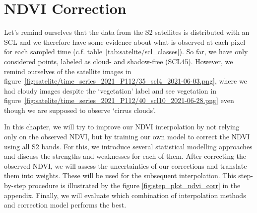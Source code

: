 \chapter{NDVI Correction} \label{sec:corr}

{
    Let's remind ourselves that the data from the S2 satellites is distributed  with an SCL and we therefore have some evidence about what is observed at each pixel for each sampled time (c.f. table~\ref{tab:satelite/scl_classes}). So far, we have only considered points, labeled as cloud- and shadow-free (SCL45). However, we remind ourselves of the satellite images in figure~\ref{fig:satelite/time_series_2021_P112/35_scl4_2021-06-03.png}, where we had cloudy images despite the `vegetation' label and see vegetation in figure~\ref{fig:satelite/time_series_2021_P112/40_scl10_2021-06-28.png} even though we are supposed to observe `cirrus clouds'.
    


    
    In this chapter, we will try to improve our NDVI interpolation by not relying only on the observed NDVI, but by training our own model to correct the NDVI using all S2 bands. For this, we introduce several statistical modelling approaches and discuss the strengths and weaknesses for each of them. After correcting the observed NDVI, we will assess the uncertainties of our corrections and translate them into weights. These will be used for the subsequent interpolation. This step-by-step procedure is illustrated by the figure \ref{fig:step_plot_ndvi_corr} in the appendix. Finally, we will evaluate which combination of interpolation methods and correction model performs the best.
}

